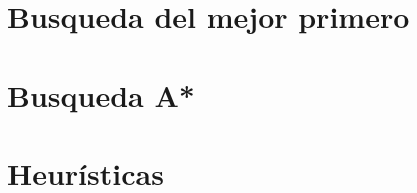     
    \section{Busqueda del mejor primero}%
    
    \section{Busqueda A*}%
    
    \section{Heurísticas}%
    